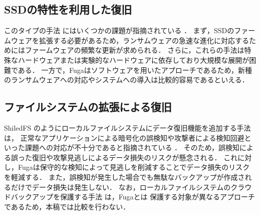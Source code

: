 \subsection{SSDの特性を利用した復旧}
このタイプの手法 \cite{huang2017flashguard,baek2018ssd} にはいくつかの課題が指摘されている \cite{wang2024ransom}．
まず，SSDのファームウェアを拡張する必要があるため，ランサムウェアの急速な進化に対応するためにはファームウェアの頻繁な更新が求められる．
さらに，これらの手法は特殊なハードウェアまたは実験的なハードウェアに依存しており大規模な展開が困難である．
一方で，Fugaはソフトウェアを用いたアプローチであるため，新種のランサムウェアへの対応やシステムへの導入は比較的容易であるといえる．

\subsection{ファイルシステムの拡張による復旧}
ShiledFS \cite{shieldFS} のようにローカルファイルシステムにデータ復旧機能を追加する手法は，
正常なアプリケーションによる暗号化の誤検知や攻撃者による検知回避といった課題への対応が不十分であると指摘されている \cite{han2020effectiveness,css2024-enomoto}．
そのため，誤検知による誤った復旧や攻撃見逃しによるデータ損失のリスクが懸念される．
これに対し，Fugaは保守的な検知によって見逃しを削減することでデータ損失のリスクを軽減する．
また，誤検知が発生した場合でも無駄なバックアップが作成されるだけでデータ損失は発生しない．
なお，ローカルファイルシステムのクラウドバックアップを保護する手法 \cite{matos2018rockfs} は，Fugaとは
保護する対象が異なるアプローチであるため，本稿では比較を行わない．
